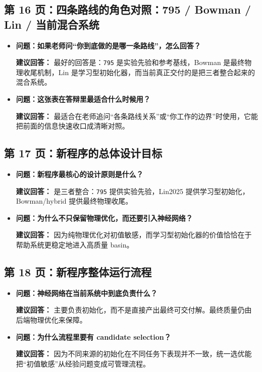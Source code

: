 \documentclass[12pt,a4paper]{ctexart}
\begin{document}
\subsection{第 16 页：四条路线的角色对照：795 / Bowman / Lin / 当前混合系统}
\begin{itemize}
\item \textbf{问题：如果老师问“你到底做的是哪一条路线”，怎么回答？}

\textbf{建议回答：} 最好的回答是：\texttt{795} 是实验先验和参考基线，Bowman 是最终物理收尾机制，Lin 是学习型初始化器，而当前真正交付的是把三者整合起来的混合系统。

\item \textbf{问题：这张表在答辩里最适合什么时候用？}

\textbf{建议回答：} 最适合在老师追问“各条路线关系”或“你工作的边界”时使用，它能把前面的信息快速收口成清晰对照。
\end{itemize}

\subsection{第 17 页：新程序的总体设计目标}
\begin{itemize}
\item \textbf{问题：新程序最核心的设计原则是什么？}

\textbf{建议回答：} 是三者整合：\texttt{795} 提供实验先验，Lin2025 提供学习型初始化，Bowman/hybrid 提供最终物理收尾。

\item \textbf{问题：为什么不只保留物理优化，而还要引入神经网络？}

\textbf{建议回答：} 因为纯物理优化对初值敏感，而学习型初始化器的价值恰恰在于帮助系统更稳定地进入高质量 basin。
\end{itemize}

\subsection{第 18 页：新程序整体运行流程}
\begin{itemize}
\item \textbf{问题：神经网络在当前系统中到底负责什么？}

\textbf{建议回答：} 主要负责初始化，而不是直接产出最终可交付解。最终质量仍由后端物理优化来保障。

\item \textbf{问题：为什么流程里要有 candidate selection？}

\textbf{建议回答：} 因为不同来源的初始化在不同任务下表现并不一致，统一选优能把“初值敏感”从经验问题变成可管理流程。
\end{itemize}
\end{document}
